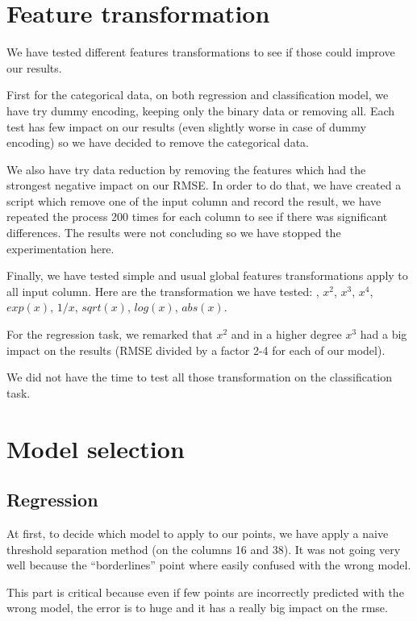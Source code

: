 \documentclass{article} %
\begin{document}
\section{Feature transformation}

We have tested different features transformations to see if those could improve our results.

First for the categorical data, on both regression and classification model, we have try dummy encoding, keeping only the binary data or removing all. Each test has few impact on our results (even slightly worse in case of dummy encoding) so we have decided to remove the categorical data.

We also have try data reduction by removing the features which had the strongest negative impact on our RMSE. In order to do that, we have created a script which remove one of the input column and record the result, we have repeated the process 200 times for each column to see if there was significant differences. The results were not concluding so we have stopped the experimentation here.

Finally, we have tested simple and usual global features transformations apply to all input column. Here are the transformation we have tested: , $x^2$, $x^3$, $x^4$, $exp(x)$, $1/x$, $sqrt(x)$, $log(x)$, $abs(x)$.

For the regression task, we remarked that $x^2$ and in a higher degree $x^3$ had a big impact on the results (RMSE divided by a factor 2-4 for each of our model).

We did not have the time to test all those transformation on the classification task.

\section{Model selection}

\subsection{Regression}

At first, to decide which model to apply to our points, we have apply a naive threshold separation method (on the columns 16 and 38). It was not going very well because the “borderlines” point where easily confused with the wrong model.

This part is critical because even if few points are incorrectly predicted with the wrong model, the error is to huge and it has a really big impact on the rmse.
\end{document}
